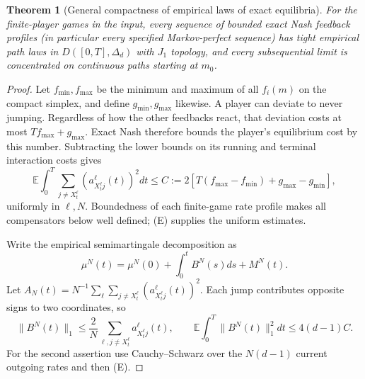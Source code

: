 \documentclass[11pt,a4paper]{article}
\newtheorem{theorem}{Theorem}[section]
\theoremstyle{definition}
\theoremstyle{remark}
\begin{document}
\begin{theorem}[General compactness of empirical laws of exact equilibria]
For the finite-player games in the input, every sequence of bounded exact Nash feedback profiles (in particular every specified Markov-perfect sequence) has tight empirical path laws in $D([0,T],\Delta_d)$ with $J_1$ topology, and every subsequential limit is concentrated on continuous paths starting at $m_0$.
\end{theorem}
\begin{proof}
Let $f_{\min},f_{\max}$ be the minimum and maximum of all $f_i(m)$ on the compact simplex, and define $g_{\min},g_{\max}$ likewise. A player can deviate to never jumping. Regardless of how the other feedbacks react, that deviation costs at most $Tf_{\max}+g_{\max}$. Exact Nash therefore bounds the player's equilibrium cost by this number. Subtracting the lower bounds on its running and terminal interaction costs gives
\[
 \mathbb E\int_0^T\sum_{j\ne X_t^\ell}
       (a_{X_t^\ell j}^\ell(t))^2dt
 \leq C:=2[T(f_{\max}-f_{\min})+g_{\max}-g_{\min}],
 \tag{E}
\]
uniformly in $\ell,N$. Boundedness of each finite-game rate profile makes all compensators below well defined; (E) supplies the uniform estimates.

Write the empirical semimartingale decomposition as
\[
 \mu^N(t)=\mu^N(0)+\int_0^t B^N(s)ds+M^N(t).
\]
Let $A_N(t)=N^{-1}\sum_\ell\sum_{j\ne X_t^\ell}(a_{X_t^\ell j}^\ell(t))^2$. Each jump contributes opposite signs to two coordinates, so
\[
 \|B^N(t)\|_1\leq\frac2N\sum_{\ell,j\ne X_t^\ell}a_{X_t^\ell j}^\ell(t),
 \qquad \mathbb E\int_0^T\|B^N(t)\|_1^2dt\leq4(d-1)C.
\]
For the second assertion use Cauchy--Schwarz over the $N(d-1)$ current outgoing rates and then (E).


\end{proof}
\end{document}
